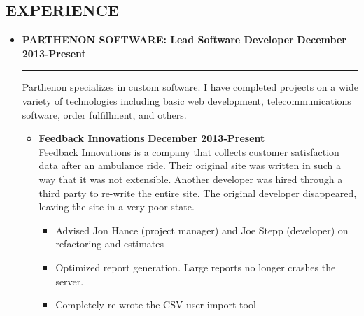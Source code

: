 \documentclass[overlapped]{res}
\begin{document}
\begin{resume}
\section{EXPERIENCE}
\vspace{0.125in}
\begin{itemize}[leftmargin=0in]
    \item[] 
        \textbf{PARTHENON SOFTWARE: Lead Software Developer} \hfill \textbf{December 2013-Present} \\[-0.1in] \rule{\textwidth}{0.5pt}
        Parthenon specializes in custom software.  I have completed projects on a wide variety of technologies including basic 
        web development, telecommunications software, order fulfillment, and others. \vspace{0.125in}
        \begin{itemize}[leftmargin=0in]
            \item[] 
                \begin{samepage}
                    \textbf{Feedback Innovations} \hfill \textbf{December 2013-Present} \\
                    Feedback Innovations is a company that collects customer satisfaction data after an ambulance ride.  Their original site was written in such a way that it was not extensible.  Another developer was hired through a third party to re-write the entire site.  The original developer disappeared, leaving the site in a very poor state.
                    \begin{itemize}
                        \item[\textbullet] Advised Jon Hance (project manager) and Joe Stepp (developer) on refactoring and estimates
                        \item[\textbullet] Optimized report generation.  Large reports no longer crashes the server.
                        \item[\textbullet] Completely re-wrote the CSV user import tool
                    \end{itemize}
                \end{samepage}


\end{itemize}
\end{itemize}
\end{resume}
\end{document}
